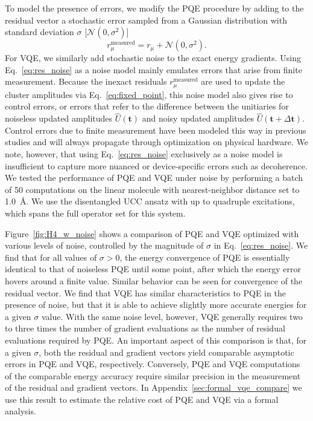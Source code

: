 \documentclass[aps,prx, reprint]{revtex4-2}
\begin{document}
To model the presence of errors, we modify the PQE procedure by adding to the residual vector a stochastic error sampled from a Gaussian distribution with standard deviation $\sigma$ [$\mathcal{N}(0,\sigma^2)$]
\begin{equation}
\label{eq:res_noise}
r_\mu^\text{measured} = r_\mu + \mathcal{N}(0,\sigma^2).
\end{equation}
For VQE, we similarly add stochastic noise to the exact energy gradients.
Using Eq.~\eqref{eq:res_noise} as a noise model mainly emulates errors that arise from finite measurement.
Because the inexact residuals $r_\mu^\text{measured}$ are used to update the cluster amplitudes via Eq.~\eqref{eq:fixed_point}, this noise model also gives rise to control errors, or errors that refer to the difference between the unitiaries for noiseless updated amplitudes $\hat{U}(\mathbf{t})$ and noisy updated amplitudes $\hat{U}(\mathbf{t}+\Delta\mathbf{ t})$.
Control errors due to finite measurement have been modeled this way in previous studies \cite{Romero:2019hk} and will always propagate through optimization on physical hardware.
We note, however, that using Eq.~\eqref{eq:res_noise} exclusively as a noise model is insufficient to capture more nuanced or device-specific errors such as decoherence.
We tested the performance of PQE and VQE under noise by performing a batch of 50 computations on the linear  molecule with nearest-neighbor distance set to 1.0~{\AA}.
We use the  disentangled UCC ansatz with up to quadruple excitations, which spans the full operator set for this system.

Figure~\ref{fig:H4_w_noise} shows a comparison of PQE and VQE optimized with various levels of noise, controlled by the magnitude of $\sigma$ in Eq.~\eqref{eq:res_noise}.
We find that for all values of $\sigma > 0$, the energy convergence of PQE is essentially identical to that of noiseless PQE until some point, after which the energy error hovers around a finite value.
Similar behavior can be seen for convergence of the residual vector.
We find that VQE has similar characteristics to PQE in the presence of noise, but that it is able to achieve slightly more accurate energies for a given $\sigma$ value.
With the same noise level, however, VQE generally requires two to three times the number of gradient evaluations as the number of residual evaluations required by PQE.
An important aspect of this comparison is that, for a given $\sigma$, both the residual and gradient vectors yield comparable asymptotic errors in PQE and VQE, respectively.
Conversely, PQE and VQE computations of the comparable energy accuracy require similar precision in the measurement of the residual and gradient vectors.
In Appendix~\ref{sec:formal_vqe_compare} we use this result to estimate the relative cost of PQE and VQE via a formal analysis.
\end{document}
